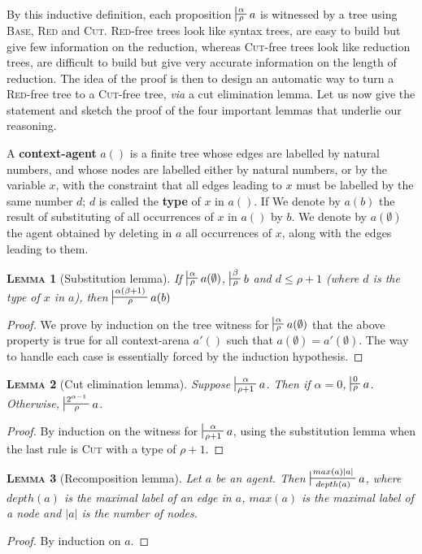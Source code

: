 \documentclass{article}
\newtheorem{lemma}{\textsc{Lemma}}
\begin{document}
By this inductive definition, each proposition $\sststile{\rho}{\alpha} a$ is witnessed by a tree using \textsc{Base}, \textsc{Red} and \textsc{Cut}. \textsc{Red}-free trees look like
syntax trees, are easy to build but give few information on the reduction, whereas \textsc{Cut}-free trees look like reduction trees, are difficult to build but give very accurate information
on the length of reduction. The idea of the proof is then to design an automatic way to turn a \textsc{Red}-free tree to a \textsc{Cut}-free tree, \emph{via} a cut elimination lemma.
Let us now give the statement and sketch the proof of the four important lemmas that underlie our reasoning.

A \textbf{context-agent} $a()$ is a finite tree whose edges are labelled by natural numbers, and whose nodes are labelled either by natural numbers, or by the variable $x$, with the constraint that
all edges leading to $x$ must be labelled by the same number $d$; $d$ is called the \textbf{type} of $x$ in $a()$. If
We denote by $a(b)$ the result of substituting of all occurrences of $x$ in $a()$ by $b$. We denote by $a(\emptyset)$ the agent obtained by deleting in $a$
all occurrences of $x$, along with the edges leading to them.


\begin{lemma}[Substitution lemma]
If $\sststile{\rho}{\alpha} a(\emptyset)$, $\sststile{\rho}{\beta} b$ and $d \leq \rho + 1$ (where $d$ is the type of $x$ in $a$), then $\sststile{\rho}{\alpha(\beta+1)} a(b)$
\label{main_substitution}
\end{lemma}
\begin{proof}
We prove by induction on the tree witness for $\sststile{\rho}{\alpha} a(\emptyset)$ that the above property is true for all context-arena $a'()$ such that $a(\emptyset) = a'(\emptyset)$. The way
to handle each case is essentially forced by the induction hypothesis.
\end{proof}

\begin{lemma}[Cut elimination lemma]
Suppose $\sststile{\rho+1}{\alpha} a$. Then if $\alpha = 0$, $\sststile{\rho}{0} a$. Otherwise, $\sststile{\rho}{2^{\alpha-1}} a$.
\end{lemma}
\begin{proof}
By induction on the witness for $\sststile{\rho+1}{\alpha} a$, using the substitution lemma when the last rule is \textsc{Cut} with a type of $\rho+1$.
\end{proof}

\begin{lemma}[Recomposition lemma]
Let $a$ be an agent. Then $\sststile{depth(a)}{max(a)|a|} a$, where $depth(a)$ is the maximal label of an edge in $a$, $max(a)$ is the maximal label of a node and $|a|$ is the number of nodes.
\end{lemma}
\begin{proof}
By induction on $a$.
\end{proof}
\end{document}
